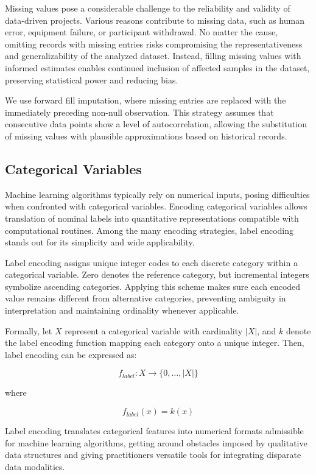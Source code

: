 \documentclass[10pt]{extarticle}
\begin{document}
Missing values pose a considerable challenge to the reliability and validity of data-driven projects. Various reasons contribute to missing data, such as human error, equipment failure, or participant withdrawal. No matter the cause, omitting records with missing entries risks compromising the representativeness and generalizability of the analyzed dataset. Instead, filling missing values with informed estimates enables continued inclusion of affected samples in the dataset, preserving statistical power and reducing bias.

We use forward fill imputation, where missing entries are replaced with the immediately preceding non-null observation. This strategy assumes that consecutive data points show a level of autocorrelation, allowing the substitution of missing values with plausible approximations based on historical records.

\subsection{Categorical Variables}

Machine learning algorithms typically rely on numerical inputs, posing difficulties when confronted with categorical variables. Encoding categorical variables allows translation of nominal labels into quantitative representations compatible with computational routines. Among the many encoding strategies, label encoding stands out for its simplicity and wide applicability.

Label encoding assigns unique integer codes to each discrete category within a categorical variable. Zero denotes the reference category, but incremental integers symbolize ascending categories. Applying this scheme makes sure each encoded value remains different from alternative categories, preventing ambiguity in interpretation and maintaining ordinality whenever applicable.

Formally, let \(X\) represent a categorical variable with cardinality \(\left|X\right|\), and \(k\) denote the label encoding function mapping each category onto a unique integer. Then, label encoding can be expressed as:

\[
f_{label}: X \rightarrow \{0, \ldots , \left|X\right|\}
\]

where

\[
f_{label}(x) = k(x)
\]

Label encoding translates categorical features into numerical formats admissible for machine learning algorithms, getting around obstacles imposed by qualitative data structures and giving practitioners versatile tools for integrating disparate data modalities.
\end{document}
